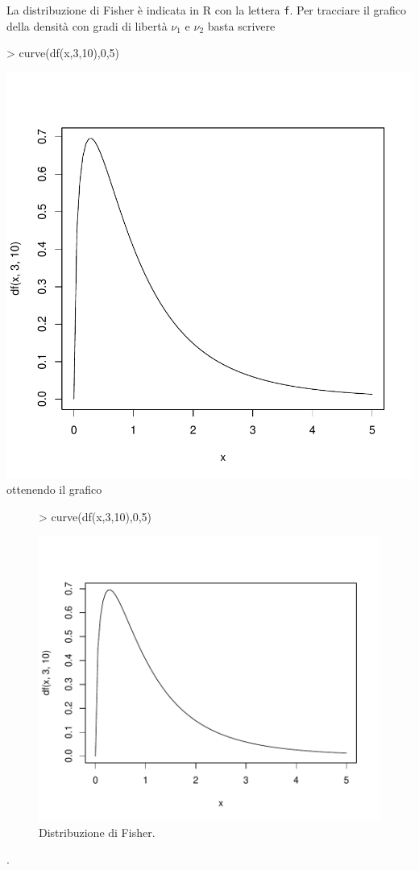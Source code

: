 \documentclass[onecolumn,11pt]{book}
\begin{document}
La distribuzione di Fisher \`e indicata in \textsf{R} con la lettera \texttt{f}. Per tracciare il grafico della densit\`a con gradi di libert\`a $\nu_1$ e $\nu_2$ basta scrivere  
\begin{Schunk}
\begin{Sinput}
> curve(df(x,3,10),0,5)
\end{Sinput}
\end{Schunk}
\includegraphics{statisticaconR-311}
ottenendo il grafico
\begin{figure}[htbp]
\begin{center}
\begin{Schunk}
\begin{Sinput}
> curve(df(x,3,10),0,5)
\end{Sinput}
\end{Schunk}
\includegraphics{statisticaconR-312}
\caption{Distribuzione di Fisher.}
\label{datiist}
\end{center}
\end{figure}.
\end{document}
